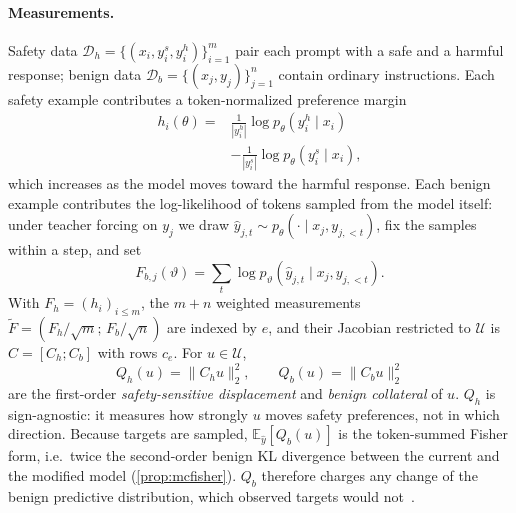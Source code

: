 \documentclass[11pt]{article}
\newcommand{\U}{\mathcal{U}}
\newcommand{\Ft}{\widetilde{F}}
\newcommand{\Ch}{C_{h}}
\newcommand{\Cb}{C_{b}}
\begin{document}
\paragraph{Measurements.}
Safety data $\mathcal D_h=\{(x_i,y_i^s,y_i^h)\}_{i=1}^{m}$ pair each prompt with a safe and a harmful response; benign data $\mathcal D_b=\{(x_j,y_j)\}_{j=1}^{n}$ contain ordinary instructions. Each safety example contributes a token-normalized preference margin
\begin{equation}
\begin{aligned}
h_i(\theta)={}&\tfrac{1}{|y_i^h|}\log p_\theta(y_i^h\mid x_i)\\
&-\tfrac{1}{|y_i^s|}\log p_\theta(y_i^s\mid x_i),
\end{aligned}
\label{eq:safety_margin}
\end{equation}
which increases as the model moves toward the harmful response. Each benign example contributes the log-likelihood of tokens sampled from the model itself: under teacher forcing on $y_j$ we draw $\hat y_{j,t}\sim p_\theta(\cdot\mid x_j,y_{j,<t})$, fix the samples within a step, and set
\begin{equation}
F_{b,j}(\vartheta)=\textstyle\sum_{t}\log p_\vartheta(\hat y_{j,t}\mid x_j,y_{j,<t}).
\label{eq:mc_fisher}
\end{equation}
With $F_h=(h_i)_{i\le m}$, the $m+n$ weighted measurements $\Ft=(F_h/\sqrt m;\,F_b/\sqrt n)$ are indexed by $e$, and their Jacobian restricted to $\U$ is $C=[\Ch;\Cb]$ with rows $c_e$. For $u\in\U$,
\begin{equation}
Q_h(u)=\|\Ch u\|_2^2,\qquad Q_b(u)=\|\Cb u\|_2^2
\label{eq:metrics}
\end{equation}
are the first-order \emph{safety-sensitive displacement} and \emph{benign collateral} of $u$. $Q_h$ is sign-agnostic: it measures how strongly $u$ moves safety preferences, not in which direction. Because targets are sampled, $\mathbb E_{\hat y}[Q_b(u)]$ is the token-summed Fisher form, i.e.\ twice the second-order benign KL divergence between the current and the modified model (\cref{prop:mcfisher}). $Q_b$ therefore charges any change of the benign predictive distribution, which observed targets would not~\citep{kunstner2019limitations}.
\end{document}
